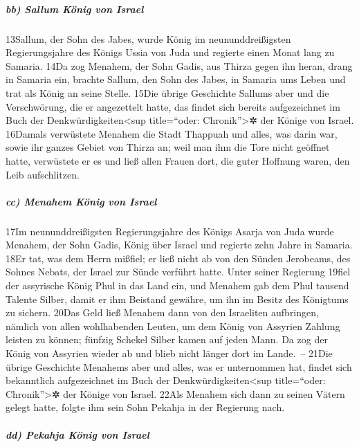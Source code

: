 \hypertarget{bb-sallum-kuxf6nig-von-israel}{%
\subparagraph{bb) Sallum König von
Israel}\label{bb-sallum-kuxf6nig-von-israel}}

13Sallum, der Sohn des Jabes, wurde König im neununddreißigsten
Regierungsjahre des Königs Ussia von Juda und regierte einen Monat lang
zu Samaria. 14Da zog Menahem, der Sohn Gadis, aus Thirza gegen ihn
heran, drang in Samaria ein, brachte Sallum, den Sohn des Jabes, in
Samaria ums Leben und trat als König an seine Stelle. 15Die übrige
Geschichte Sallums aber und die Verschwörung, die er angezettelt hatte,
das findet sich bereits aufgezeichnet im Buch der
Denkwürdigkeiten\textless sup title=``oder: Chronik''\textgreater✲ der
Könige von Israel. 16Damals verwüstete Menahem die Stadt Thappuah und
alles, was darin war, sowie ihr ganzes Gebiet von Thirza an; weil man
ihm die Tore nicht geöffnet hatte, verwüstete er es und ließ allen
Frauen dort, die guter Hoffnung waren, den Leib aufschlitzen.

\hypertarget{cc-menahem-kuxf6nig-von-israel}{%
\subparagraph{cc) Menahem König von
Israel}\label{cc-menahem-kuxf6nig-von-israel}}

17Im neununddreißigsten Regierungsjahre des Königs Asarja von Juda wurde
Menahem, der Sohn Gadis, König über Israel und regierte zehn Jahre in
Samaria. 18Er tat, was dem Herrn mißfiel; er ließ nicht ab von den
Sünden Jerobeams, des Sohnes Nebats, der Israel zur Sünde verführt
hatte. Unter seiner Regierung 19fiel der assyrische König Phul in das
Land ein, und Menahem gab dem Phul tausend Talente Silber, damit er ihm
Beistand gewähre, um ihn im Besitz des Königtums zu sichern. 20Das Geld
ließ Menahem dann von den Israeliten aufbringen, nämlich von allen
wohlhabenden Leuten, um dem König von Assyrien Zahlung leisten zu
können; fünfzig Schekel Silber kamen auf jeden Mann. Da zog der König
von Assyrien wieder ab und blieb nicht länger dort im Lande.~-- 21Die
übrige Geschichte Menahems aber und alles, was er unternommen hat,
findet sich bekanntlich aufgezeichnet im Buch der
Denkwürdigkeiten\textless sup title=``oder: Chronik''\textgreater✲ der
Könige von Israel. 22Als Menahem sich dann zu seinen Vätern gelegt
hatte, folgte ihm sein Sohn Pekahja in der Regierung nach.

\hypertarget{dd-pekahja-kuxf6nig-von-israel}{%
\subparagraph{dd) Pekahja König von
Israel}\label{dd-pekahja-kuxf6nig-von-israel}}

